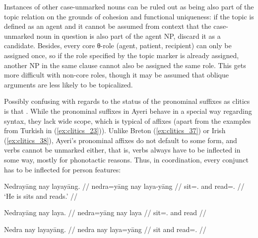 \ex\label{ex:clitics_46}
\xe

Instances of other case-unmarked nouns can be ruled out as being also part of
the topic relation on the grounds of cohesion and functional uniqueness: if the
topic is defined as an agent and it cannot be assumed from context that the
case-unmarked noun in question is also part of the agent NP, discard it as a
candidate. Besides, every core θ-role (agent, patient, recipient) can only be
assigned once, so if the role specified by the topic marker is already
assigned, another NP in the same clause cannot also be assigned the same role.
This gets more difficult with non-core roles, though it may be assumed that
oblique arguments are less likely to be topicalized.

Possibly confusing with regards to the status of the pronominal suffixes as
cli\-tics is that .
While the pronominal suffixes in Ayeri behave in a special way regarding
syntax, they lack wide scope, which is typical of affixes (apart from the
examples from Turkish in (\ref{ex:clitics_23})). Unlike Breton
(\ref{ex:clitics_37}) or Irish (\ref{ex:clitics_38}), Ayeri's pronominal
affixes do not default to some form, and verbs cannot be unmarked either, that
is, verbs always have to be inflected in some way, mostly for phonotactic
reasons. Thus, in coordination, every conjunct has to be inflected for person
features:

\pex\label{ex:clitics_47}
\a\label{ex:clitics_47a}\begingl
	\gla Nedrayāng nay layayāng. //
	\glb nedra=yāng nay laya-yāng //
	\glc sit=\TsgM{}.\Aarg{} and read=\TsgM{}.\Aarg{} //
	\glft `He is sits and reads.' //
\endgl

\a\label{ex:clitics_47b}\ljudge{*}\begingl
	\gla Nedrayāng nay laya. //
	\glb nedra=yāng nay laya //
	\glc sit=\TsgM{}.\Aarg{} and read //
\endgl

\a\label{ex:clitics_47c}\ljudge{*}\begingl
	\gla Nedra nay layayāng. //
	\glb nedra nay laya=yāng //
	\glc sit and read=\TsgM{}.\Aarg{} //
\endgl
\xe

